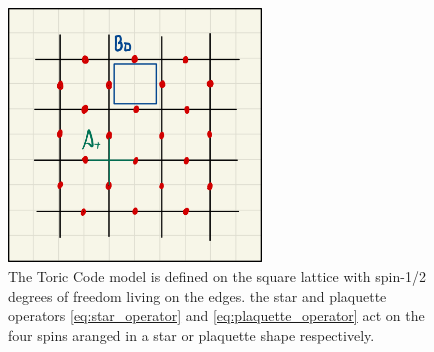\begin{figure}
	\centering
	\includegraphics[width=0.6\textwidth]{figures/Toric_Code/toric_code_star_and_plaquette_operator.jpeg}
	\caption{The Toric Code model is defined on the square lattice with spin-1/2 degrees of freedom living on the edges. the star and plaquette operators \eqref{eq:star_operator} and \eqref{eq:plaquette_operator} act on the four spins aranged in a star or plaquette shape respectively.}
	\label{fig:toric_code_star_and_plaquette_operators}
\end{figure}
